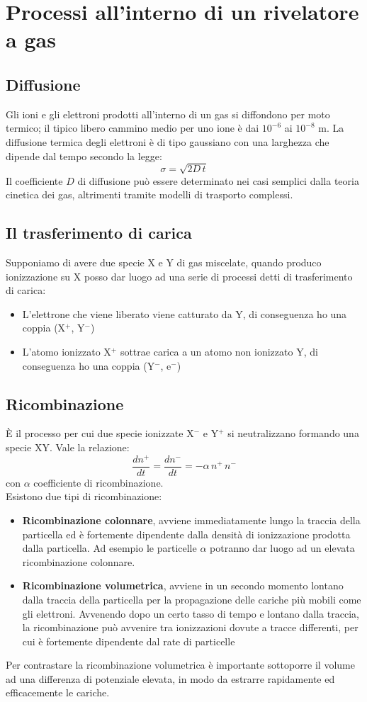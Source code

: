 \section{Processi all'interno di un rivelatore a gas}
\subsection{Diffusione}
Gli ioni e gli elettroni prodotti all'interno di un gas si diffondono per moto termico; il tipico libero cammino medio per uno ione \`e dai 
$10^{-6}$ ai $10^{-8}$ m.
La diffusione termica degli elettroni \`e di tipo gaussiano con una larghezza che dipende dal tempo secondo la legge:
\begin{equation*}
\sigma = \sqrt{2D\, t}
\end{equation*}
Il coefficiente $D$ di diffusione pu\`o essere determinato nei casi semplici dalla teoria cinetica dei gas, altrimenti tramite modelli di trasporto complessi.
\subsection{Il trasferimento di carica}
Supponiamo di avere due specie X e Y di gas miscelate, quando produco ionizzazione su X posso dar luogo ad una serie di processi detti di trasferimento di carica:
\begin{itemize}
\item L'elettrone che viene liberato viene catturato da Y, di conseguenza ho una coppia (X$^+$, Y$^{-}$)
\item L'atomo ionizzato X$^+$ sottrae carica a un atomo non ionizzato Y, di conseguenza ho una coppia (Y$^{-}$, e$^-$)
\end{itemize}
\subsection{Ricombinazione}
\`E il processo per cui due specie ionizzate X$^-$ e Y$^+$ si neutralizzano formando una specie XY.
Vale la relazione:
\begin{equation*}
\frac{dn^+}{dt} = \frac{dn^-}{dt} = - \alpha \, n^+ \, n^-
\end{equation*}
con $\alpha$ coefficiente di ricombinazione.\\
Esistono due tipi di ricombinazione:
\begin{itemize}
\item \textbf{Ricombinazione colonnare}, avviene immediatamente lungo la traccia della particella ed \`e fortemente dipendente dalla densit\`a di ionizzazione prodotta dalla particella.
Ad esempio le particelle $\alpha$ potranno dar luogo ad un elevata ricombinazione colonnare.
\item \textbf{Ricombinazione volumetrica}, avviene in un secondo momento lontano dalla traccia della particella per la propagazione
delle cariche pi\`u mobili come gli elettroni. Avvenendo dopo un certo tasso di tempo e lontano dalla traccia, la ricombinazione pu\`o avvenire tra ionizzazioni
dovute a tracce differenti, per cui \`e fortemente dipendente dal rate di particelle
\end{itemize}
Per contrastare la ricombinazione volumetrica \`e importante sottoporre il volume ad una differenza di potenziale elevata, in modo da estrarre 
rapidamente ed efficacemente le cariche.
